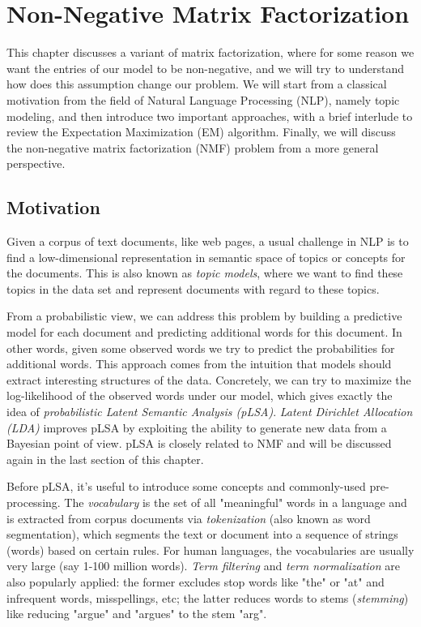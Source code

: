 \documentclass[../book-template.tex]{subfiles}
\begin{document}
\chapter{Non-Negative Matrix Factorization}
This chapter discusses a variant of matrix factorization, where for some reason we want the entries of our model to be non-negative, and we will try to understand how does this assumption change our problem. We will start from a classical motivation from the field of Natural Language Processing (NLP), namely topic modeling, and then introduce two important approaches, with a brief interlude to review the Expectation Maximization (EM) algorithm. Finally, we will discuss the non-negative matrix factorization (NMF) problem from a more general perspective.

\section{Motivation}
Given a corpus of text documents, like web pages, a usual challenge in NLP is to find a low-dimensional representation in semantic space of topics or concepts for the documents. This is also known as \emph{topic models}, where we want to find these topics in the data set and represent documents with regard to these topics. 
\par From a probabilistic view, we can address this problem by building a predictive model for each document and predicting additional words for this document. In other words, given some observed words we try to predict the probabilities for additional words. This approach comes from the intuition that models should extract interesting structures of the data. Concretely, we can try to maximize the log-likelihood of the observed words under our model, which gives exactly the idea of \emph{probabilistic Latent Semantic Analysis (pLSA)}. \emph{Latent Dirichlet Allocation (LDA)} improves pLSA by exploiting the ability to generate new data from a Bayesian point of view. pLSA is closely related to NMF and will be discussed again in the last section of this chapter.
\par Before pLSA, it's useful to introduce some concepts and commonly-used pre-processing. The \emph{vocabulary} is the set of all "meaningful" words in a language and is extracted from corpus documents via \emph{tokenization} (also known as word segmentation), which segments the text or document into a sequence of strings (words) based on certain rules. For human languages, the vocabularies are usually very large (say 1-100 million words). \emph{Term filtering} and \emph{term normalization} are also popularly applied: the former excludes stop words like "the" or "at" and infrequent words, misspellings, etc; the latter reduces words to stems (\emph{stemming}) like reducing "argue" and "argues" to the stem "arg".
\end{document}
